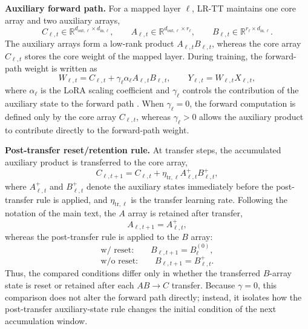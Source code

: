 \documentclass[AMA,LATO1COL]{WileyNJDv5}
\begin{document}
\noindent\textbf{Auxiliary forward path.}
For a mapped layer \(\ell\), LR-TT maintains one core array and two auxiliary arrays,
\begin{equation}
C_{\ell,t}\in\mathbb{R}^{d_{\mathrm{out},\ell}\times d_{\mathrm{in},\ell}},
\qquad
A_{\ell,t}\in\mathbb{R}^{d_{\mathrm{out},\ell}\times r_\ell},
\qquad
B_{\ell,t}\in\mathbb{R}^{r_\ell\times d_{\mathrm{in},\ell}}.
\label{eq:S4_state_definition}
\end{equation}
The auxiliary arrays form a low-rank product \(A_{\ell,t}B_{\ell,t}\), whereas the core array \(C_{\ell,t}\) stores the core weight of the mapped layer. During training, the forward-path weight is written as
\begin{equation}
W_{\ell,t}
=
C_{\ell,t}
+
\gamma_\ell \alpha_\ell A_{\ell,t}B_{\ell,t},
\qquad
Y_{\ell,t}=W_{\ell,t}X_{\ell,t},
\label{eq:S4_aux_forward}
\end{equation}
where \(\alpha_\ell\) is the LoRA scaling coefficient and \(\gamma_\ell\) controls the contribution of the auxiliary state to the forward path \cite{gokmen2020tikitaka,hu2021lora}. When \(\gamma_\ell=0\), the forward computation is defined only by the core array \(C_{\ell,t}\), whereas \(\gamma_\ell>0\) allows the auxiliary product to contribute directly to the forward-path weight.

\noindent\textbf{Post-transfer reset/retention rule.}
At transfer steps, the accumulated auxiliary product is transferred to the core array,
\begin{equation}
C_{\ell,t+1}
=
C_{\ell,t}
+
\eta_{\mathrm{tr},\ell}A_{\ell,t}^{+}B_{\ell,t}^{+},
\label{eq:S4_core_transfer}
\end{equation}
where \(A_{\ell,t}^{+}\) and \(B_{\ell,t}^{+}\) denote the auxiliary states immediately before the post-transfer rule is applied, and \(\eta_{\mathrm{tr},\ell}\) is the transfer learning rate. Following the notation of the main text, the \(A\) array is retained after transfer,
\begin{equation}
A_{\ell,t+1}=A_{\ell,t}^{+},
\label{eq:S4_post_A}
\end{equation}
whereas the post-transfer rule is applied to the \(B\) array:
\begin{equation}
\text{w/ reset:}
\qquad
B_{\ell,t+1}=B_{\ell}^{(0)},
\label{eq:S4_reset_rule}
\end{equation}
\begin{equation}
\text{w/o reset:}
\qquad
B_{\ell,t+1}=B_{\ell,t}^{+}.
\label{eq:S4_nonreset_rule}
\end{equation}
Thus, the compared conditions differ only in whether the transferred \(B\)-array state is reset or retained after each \(AB\rightarrow C\) transfer. Because \(\gamma=0\), this comparison does not alter the forward path directly; instead, it isolates how the post-transfer auxiliary-state rule changes the initial condition of the next accumulation window.
\end{document}
